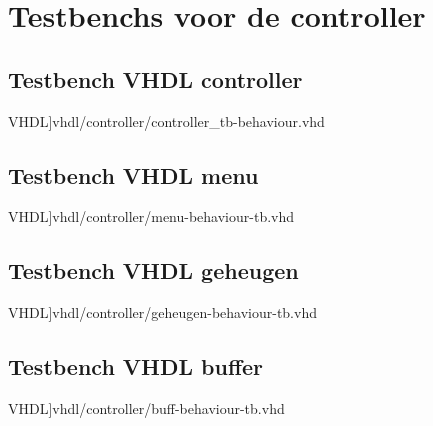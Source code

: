 \chapter[VHDL code]{Testbenchs voor de controller}
\section{Testbench VHDL controller}
\scriptsize 
  VHDL]{vhdl/controller/controller_tb-behaviour.vhd}
 \normalsize
\label{code:tb_controller}
\section{Testbench VHDL menu}
\scriptsize 
  VHDL]{vhdl/controller/menu-behaviour-tb.vhd}
 \normalsize
\label{code:tb_menu}
\section{Testbench VHDL geheugen}
\scriptsize 
  VHDL]{vhdl/controller/geheugen-behaviour-tb.vhd}
 \normalsize
\label{code:tb_geheugen}
\section{Testbench VHDL buffer}
\scriptsize 
  VHDL]{vhdl/controller/buff-behaviour-tb.vhd}
 \normalsize
\label{code:tb_buffer}